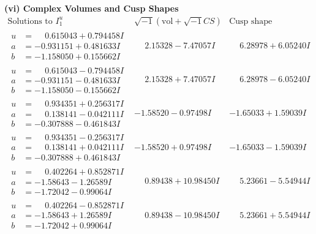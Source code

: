 \documentclass[1p]{elsarticle_modified}
\theoremstyle{definition}
\newcommand{\I}{\sqrt{-1}}
\begin{document}
\newpage\flushleft \textbf{(vi) Complex Volumes and Cusp Shapes}
$$\begin{array}{c|c|c}  
\text{Solutions to }I^u_{1}& \I (\text{vol} + \sqrt{-1}CS) & \text{Cusp shape}\\
 \hline 
\begin{aligned}
u &= \phantom{-}0.615043 + 0.794458 I \\
a &= -0.931151 + 0.481633 I \\
b &= -1.158050 + 0.155662 I\end{aligned}
 & \phantom{-}2.15328 - 7.47057 I & \phantom{-}6.28978 + 6.05240 I \\ \hline\begin{aligned}
u &= \phantom{-}0.615043 - 0.794458 I \\
a &= -0.931151 - 0.481633 I \\
b &= -1.158050 - 0.155662 I\end{aligned}
 & \phantom{-}2.15328 + 7.47057 I & \phantom{-}6.28978 - 6.05240 I \\ \hline\begin{aligned}
u &= \phantom{-}0.934351 + 0.256317 I \\
a &= \phantom{-}0.138141 - 0.042111 I \\
b &= -0.307888 - 0.461843 I\end{aligned}
 & -1.58520 - 0.97498 I & -1.65033 + 1.59039 I \\ \hline\begin{aligned}
u &= \phantom{-}0.934351 - 0.256317 I \\
a &= \phantom{-}0.138141 + 0.042111 I \\
b &= -0.307888 + 0.461843 I\end{aligned}
 & -1.58520 + 0.97498 I & -1.65033 - 1.59039 I \\ \hline\begin{aligned}
u &= \phantom{-}0.402264 + 0.852871 I \\
a &= -1.58643 - 1.26589 I \\
b &= -1.72042 - 0.99064 I\end{aligned}
 & \phantom{-}0.89438 + 10.98450 I & \phantom{-}5.23661 - 5.54944 I \\ \hline\begin{aligned}
u &= \phantom{-}0.402264 - 0.852871 I \\
a &= -1.58643 + 1.26589 I \\
b &= -1.72042 + 0.99064 I\end{aligned}
 & \phantom{-}0.89438 - 10.98450 I & \phantom{-}5.23661 + 5.54944 I \\ \hline\begin{aligned}

\end{aligned}
\end{array}$$
\end{document}
